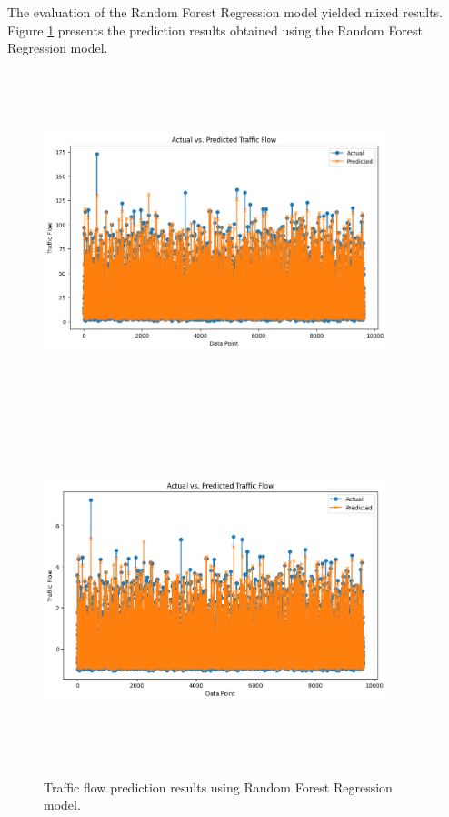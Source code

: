 \documentclass{IEEEtran}
\begin{document}
The evaluation of the Random Forest Regression model yielded mixed results. Figure \ref{fig:random_forest_results} presents the prediction results obtained using the Random Forest Regression model.

\begin{figure}[p]
    \centering
    \includegraphics[width=10cm, height=10cm]{random_forest.png}
    \includegraphics[width=10cm, height=10cm]{random_forest_norm.png}
    \caption{Traffic flow prediction results using Random Forest Regression model.}
    \label{fig:random_forest_results}
\end{figure}
\end{document}
